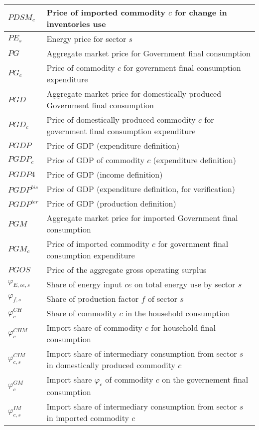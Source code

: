 \documentclass[12pt]{article}
\numberwithin{equation}{section}
\begin{document}
\begin{longtable}{@{}p{4cm}p{9cm}@{}}
 \midrule 
$PDSM_{c}$ & Price of imported commodity $c$ for change in inventories use \\
 \midrule 
$PE_{s}$ & Energy price for sector $s$ \\
 \midrule 
$PG$ & Aggregate market price for Government final consumption \\
 \midrule 
$PG_{c}$ & Price of commodity $c$ for government final consumption expenditure \\
 \midrule 
$PGD$ & Aggregate market price for domestically produced Government final consumption \\
 \midrule 
$PGD_{c}$ & Price of domestically produced commodity $c$ for government final consumption expenditure \\
 \midrule 
$PGDP$ & Price of GDP (expenditure definition) \\
 \midrule 
$PGDP_{c}$ & Price of GDP of commodity $c$ (expenditure definition) \\
 \midrule 
$PGDP4$ & Price of GDP (income definition) \\
 \midrule 
$PGDP^{bis}$ & Price of GDP (expenditure definition, for verification) \\
 \midrule 
$PGDP^{ter}$ & Price of GDP (production definition) \\
 \midrule 
$PGM$ & Aggregate market price for imported Government final consumption \\
 \midrule 
$PGM_{c}$ & Price of imported commodity $c$ for government final consumption expenditure \\
 \midrule 
$PGOS$ & Price of the aggregate gross operating surplus \\
 \midrule 
$\varphi_{E, ce, s}$ & Share of energy input $ce$  on total energy use by sector $s$ \\
 \midrule 
$\varphi_{f, s}$ & Share of production factor $f$ of sector $s$ \\
 \midrule 
$\varphi^{CH}_{c}$ & Share of commodity $c$ in the household consumption \\
 \midrule 
$\varphi^{CHM}_{c}$ & Import share of commodity $c$ for household final consumption \\
 \midrule 
$\varphi^{CIM}_{c, s}$ & Import share of intermediary consumption from sector $s$ in domestically produced commodity $c$ \\
 \midrule 
$\varphi^{GM}_{c}$ & Import share $\varphi_c$ of commodity $c$ on the governement final consumption \\
 \midrule 
$\varphi^{IM}_{c, s}$ & Import share of intermediary consumption from sector $s$ in imported commodity $c$ \\

\end{longtable}
\end{document}

